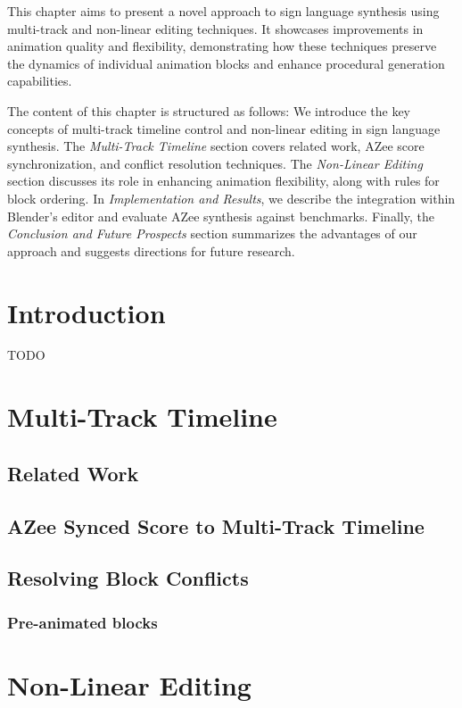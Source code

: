 \documentclass[../../main.tex]{subfiles}
\begin{document}
This chapter aims to present a novel approach to sign language synthesis using multi-track and non-linear editing techniques. It showcases improvements in animation quality and flexibility, demonstrating how these techniques preserve the dynamics of individual animation blocks and enhance procedural generation capabilities.

The content of this chapter is structured as follows: We introduce the key concepts of multi-track timeline control and non-linear editing in sign language synthesis. The \emph{Multi-Track Timeline} section covers related work, AZee score synchronization, and conflict resolution techniques. The \emph{Non-Linear Editing} section discusses its role in enhancing animation flexibility, along with rules for block ordering. In \emph{Implementation and Results}, we describe the integration within Blender’s editor and evaluate AZee synthesis against benchmarks. Finally, the \emph{Conclusion and Future Prospects} section summarizes the advantages of our approach and suggests directions for future research.

\section{Introduction}

TODO


\section{Multi-Track Timeline}

\subsection{Related Work}

\subsection{AZee Synced Score to Multi-Track Timeline}

\subsection{Resolving Block Conflicts}


\subsubsection{Pre-animated blocks}

\section{Non-Linear Editing}
\end{document}
